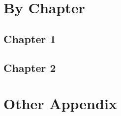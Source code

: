\documentclass[a4paper, nobind]{templates/ociamthesis}
\newcommand*{\bibtitle}{Bibliography}
\begin{document}
\startappendices

\hypertarget{by-chapter}{%
\chapter{By Chapter}\label{by-chapter}}

\hypertarget{chapter-1}{%
\section{Chapter 1}\label{chapter-1}}

\hypertarget{chapter-2}{%
\section{Chapter 2}\label{chapter-2}}

\hypertarget{other-appendix}{%
\chapter{Other Appendix}\label{other-appendix}}




\setlength{\baselineskip}{0pt} %

{\renewcommand*\MakeUppercase[1]{#1}%
\printbibliography[heading=bibintoc,title={\bibtitle}]}
\end{document}
